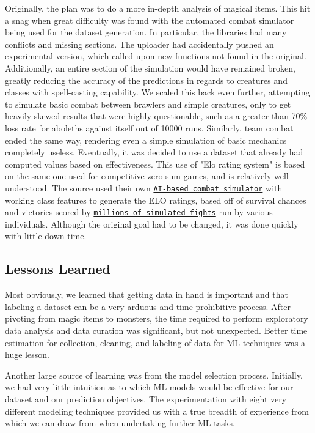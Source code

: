 \documentclass[12pt]{diazessay}
\begin{document}
Originally, the plan was to do a more in-depth analysis of magical items. This hit a snag when great difficulty was found with the automated combat simulator being used for the dataset generation. In particular, the libraries had many conflicts and missing sections. The uploader had accidentally pushed an experimental version, which called upon new functions not found in the original. Additionally, an entire section of the simulation would have remained broken, greatly reducing the accuracy of the predictions in regards to creatures and classes with spell-casting capability. We scaled this back even further, attempting to simulate basic combat between brawlers and simple creatures, only to get heavily skewed results that were highly questionable, such as a greater than 70\% loss rate for aboleths against itself out of 10000 runs. Similarly, team combat ended the same way, rendering even a simple simulation of basic mechanics completely useless.
\newline
Eventually, it was decided to use a dataset that already had computed values based on effectiveness. This use of "Elo rating system" is based on the same one used for competitive zero-sum games, and is relatively well understood. The source used their own \href{https://www.dndcombat.com/dndcombat/Welcome.do}{\texttt{AI-based combat simulator}} with working class features to generate the ELO ratings, based off of survival chances and victories scored by \href{https://www.dndcombat.com/code_updates.html?v=3.51}{\texttt{millions of simulated fights}} run by various individuals. Although the original goal had to be changed, it was done quickly with little down-time.
\newline


\subsection{Lessons Learned}

Most obviously, we learned that getting data in hand is important and that labeling a dataset can be a very arduous  and time-prohibitive process.
After pivoting from magic items to monsters, the time required to perform exploratory data analysis and data curation was significant, but not unexpected.
Better time estimation for collection, cleaning, and labeling of data for ML techniques was a huge lesson.

Another large source of learning was from the model selection process.
Initially, we had very little intuition as to which ML models would be effective for our dataset and our prediction objectives.
The experimentation with eight very different modeling techniques provided us with a true breadth of experience from which we can draw from when undertaking further ML tasks.
\end{document}
